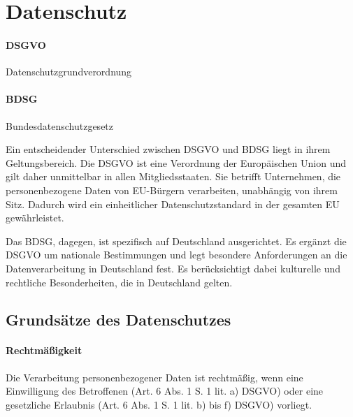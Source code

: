 \section{Datenschutz}
\label{sec:Datenschutz}



\paragraph{DSGVO} Datenschutzgrundverordnung

\paragraph{BDSG} Bundesdatenschutzgesetz


\begin{center}
\end{center}


Ein entscheidender Unterschied zwischen DSGVO und BDSG liegt in ihrem Geltungsbereich. Die DSGVO ist eine Verordnung der Europäischen Union und gilt daher unmittelbar in allen Mitgliedsstaaten. Sie betrifft Unternehmen, die personenbezogene Daten von EU-Bürgern verarbeiten, unabhängig von ihrem Sitz. Dadurch wird ein einheitlicher Datenschutzstandard in der gesamten EU gewährleistet.

Das BDSG, dagegen, ist spezifisch auf Deutschland ausgerichtet. Es ergänzt die DSGVO um nationale Bestimmungen und legt besondere Anforderungen an die Datenverarbeitung in Deutschland fest. Es berücksichtigt dabei kulturelle und rechtliche Besonderheiten, die in Deutschland gelten.

\subsection{Grundsätze des Datenschutzes}
\label{sec:GrundsaetzeDesDatenschutzes}


\paragraph{Rechtmäßigkeit} Die Verarbeitung personenbezogener Daten ist rechtmäßig, wenn eine Einwilligung des Betroffenen (Art. 6 Abs. 1 S. 1 lit. a) DSGVO) oder eine gesetzliche Erlaubnis (Art. 6 Abs. 1 S. 1 lit. b) bis f) DSGVO) vorliegt.

